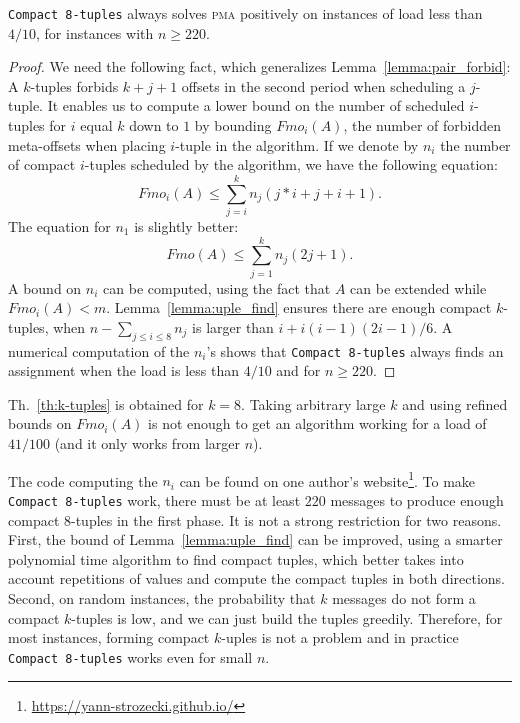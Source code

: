 \documentclass[a4paper,cleveref, autoref, thm-restate,UKenglish]{lipics-v2019}
\newcommand\pma{\textsc{pma}\xspace}
\begin{document}
\begin{theorem}\label{th:k-tuples}
\texttt{Compact 8-tuples} always solves \pma positively on instances of load less than $4/10$, for instances with $n \geq 220$.
\end{theorem}
\begin{proof}
We need the following fact, which generalizes Lemma~\ref{lemma:pair_forbid}: A $k$-tuples forbids $k+j+1$ offsets in the second period when scheduling a $j$-tuple. %
It enables us to compute a lower bound on the number of scheduled $i$-tuples for $i$ equal $k$ down to $1$ by bounding $Fmo_i(A)$, the number of forbidden meta-offsets when placing $i$-tuple in the algorithm.
If we denote by $n_i$ the number of compact $i$-tuples scheduled by the algorithm,
we have the following equation:  $$ Fmo_i(A) \leq \displaystyle{\sum_{j=i}^k n_j(j*i + j + i+ 1)}.$$
The equation for $n_1$ is slightly better: 
$$ Fmo(A) \leq \displaystyle{\sum_{j=1}^k n_j(2j + 1)}.$$
A bound on $n_i$ can be computed, using the fact that $A$ can be extended while $Fmo_i(A) < m$. 
Lemma~\ref{lemma:uple_find} ensures there are enough compact $k$-tuples, when $n - \sum_{j \leq i \leq 8} n_j$ is larger than $i + i(i-1)(2i-1)/6$. 
A numerical computation of the $n_i$'s shows that \texttt{Compact 8-tuples} always finds an assignment when the load is less than $4/10$ and for $n \geq 220$.
\end{proof}

Th.~\ref{th:k-tuples} is obtained for $k=8$. Taking arbitrary large $k$ and using refined bounds on $Fmo_i(A)$ is not enough to get an algorithm working for a load of $41/100$ (and it only works from larger $n$).

The code computing the $n_i$ can be found on one author's website\footnote{\url{https://yann-strozecki.github.io/}}.
To make \texttt{Compact 8-tuples} work, there must be at least $220$ messages to
produce enough compact $8$-tuples in the first phase. It is not a strong restriction for two reasons. First, the bound of Lemma~\ref{lemma:uple_find} can be improved, using a smarter polynomial time algorithm to find compact tuples, which better takes into account repetitions of values and compute the compact tuples in both directions. Second, on random instances, the probability that $k$ messages do not form a compact $k$-tuples is low, and we can just build the tuples greedily. Therefore, for most instances, forming compact $k$-uples is not a problem and in practice \texttt{Compact 8-tuples} works even for small $n$.
\end{document}
